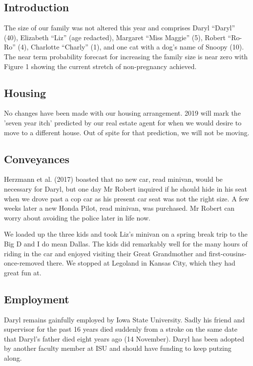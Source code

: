 \documentclass[letterpaper,11pt]{article}
\begin{document}
\begin{multicols}{2}

\section{Introduction} 

The size of our family was not altered this year and comprises Daryl
\enquote{Daryl} (40), Elizabeth \enquote{Liz} (age redacted),
Margaret \enquote{Miss Maggie} (5), Robert \enquote{Ro-Ro} (4), Charlotte
 \enquote{Charly} (1), and one cat with a dog's name of Snoopy (10).  The near
 term probability forecast for increasing the family size is near zero with
 Figure 1 showing the current stretch of non-pregnancy achieved.  

\subsection{Housing}

No changes have been made with our housing arrangement. 2019 will mark the
'seven year itch' predicted by our real estate agent for when we would desire
to move to a different house. Out of spite for that prediction, we will not be moving.

\subsection{Conveyances}

Herzmann et al. (2017) boasted that no new car, read minivan, would be necessary
for Daryl, but one day Mr Robert inquired if he should hide in his seat when
we drove past a cop car as his present car seat was not the right size. A few
weeks later a new Honda Pilot, read minivan, was purchased.  Mr Robert can
worry about avoiding the police later in life now.

We loaded up the three kids and took Liz's minivan on a spring break trip to
the Big D and I do mean Dallas. The kids did remarkably well for the many
hours of riding in the car and enjoyed visiting their Great Grandmother and
first-cousins-once-removed there.  We stopped at Legoland in Kansas City,
which they had great fun at.

\subsection{Employment}
Daryl remains gainfully employed by Iowa State University. Sadly his friend and supervisor
for the past 16 years died suddenly from a stroke on the same date that Daryl's
father died eight years ago (14 November). Daryl has been adopted by another
faculty member at ISU and should have funding to keep putzing along.


\end{multicols}
\end{document}
